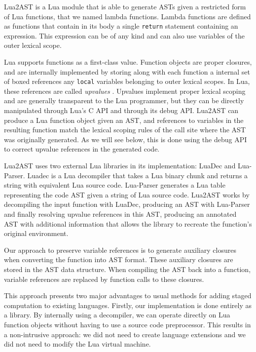 \documentclass[english]{llncs}
\begin{document}
Lua2AST is a Lua module that is able to generate ASTs given a restricted form of Lua functions, that we named lambda functions.
Lambda functions are defined as functions that contain in its body a single \texttt{return} statement containing an expression.
This expression can be of any kind and can also use variables of the outer lexical scope.

Lua supports functions as a first-class value. Function objects are proper closures, and are internally implemented by
storing along with each function a internal set of boxed references any \texttt{local} variables belonging to outer
lexical scopes. In Lua, these references are called \emph{upvalues} \cite{Ierusalimschy2006PIL}.
Upvalues implement proper lexical scoping and are generally transparent to the Lua programmer,
but they can be directly manipulated through Lua's C API and through its debug API.
Lua2AST can produce a Lua function object given an AST, and references to variables
in the resulting function match the lexical scoping rules of the call site where the
AST was originally generated. As we will see below, this is done using the debug API
to correct upvalue references in the generated code.

Lua2AST uses two external Lua libraries in its implementation: LuaDec and Lua-Parser.
Luadec \cite{luadec} is a Lua decompiler that takes a Lua binary chunk and returns a string with equivalent Lua source code.
Lua-Parser \cite{lua-parser} generates a Lua table representing the code AST given a string of Lua source code.
Lua2AST works by decompiling the input function with LuaDec, producing an AST with Lua-Parser
and finally resolving upvalue references in this AST, producing an annotated AST
with additional information that allows the library to recreate the function's original
environment.

Our approach to preserve variable references is to generate auxiliary closures
when converting the function into AST format. These auxiliary closures are
stored in the AST data structure. When compiling the AST back into a function,
variable references are replaced by function calls to these closures.

This approach presents two major advantages to usual methods for adding staged computation to existing languages.
Firstly, our implementation is done entirely as a library.
By internally using a decompiler, we can operate directly on Lua function objects
without having to use a source code preprocessor.
This results in a non-intrusive approach: we did not need to create language extensions and we did not need to modify the Lua virtual machine.
\end{document}
